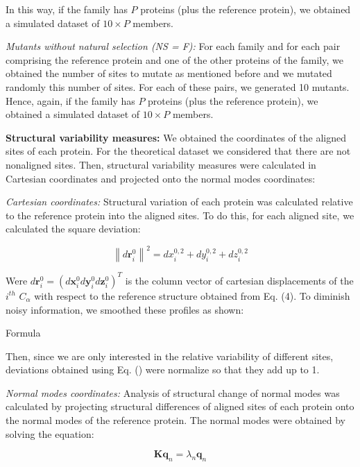 \documentclass{article}
\begin{document}
\begin{multicols}{2}
In this way, if the family has $P$ proteins (plus the reference protein), we obtained a simulated dataset of $10 \times P$  members. 

{\it Mutants without natural selection (NS = F):} For each family and for each pair comprising the reference protein and one of the other proteins of the family, we obtained the number of sites to mutate as mentioned before and we mutated randomly this number of sites. For each of these pairs, we generated 10 mutants. Hence, again, if the family has $P$ proteins (plus the reference protein), we obtained a simulated dataset of  $10 \times P$  members.

{\bf Structural variability measures:}
We obtained the coordinates of the aligned sites of each protein. For the theoretical dataset we considered that there are not nonaligned sites. Then, structural variability measures were calculated in Cartesian coordinates and projected onto the normal modes coordinates:

{\it Cartesian coordinates:}
Structural variation of each protein was calculated relative to the reference protein into the aligned sites. To do this, for each aligned site, we calculated the square deviation:
 
\begin{equation}
\left\|d\mathbf{r}^{0}_{i}\right\|^{2}=dx^{0,2}_{i}+dy^{0,2}_{i}+dz^{0,2}_{i}
\end{equation}

Were $d\mathbf{r}^{0}_{i}=(d\mathbf{x}^{0}_{i}d\mathbf{y}^{0}_{i}d\mathbf{z}^{0}_{i})^{T}$ is the column vector of cartesian displacements of the $i^{th}$ $C_{\alpha}$ with respect to the reference structure obtained from Eq. (4). To diminish noisy information, we smoothed these profiles as shown:

Formula 

Then, since we are only interested in the relative variability of different sites, deviations obtained using Eq. () were normalize so that they add up to 1.

{\it Normal modes coordinates:}
Analysis of structural change of normal modes was calculated by projecting structural differences of aligned sites of each protein onto the normal modes of the reference protein. The normal modes were obtained by solving the equation:
  
\begin{equation}
\mathbf{K}\mathbf{q}_{n} = \lambda_{n}\mathbf{q}_{n} 
\end{equation}


\end{multicols}
\end{document}
